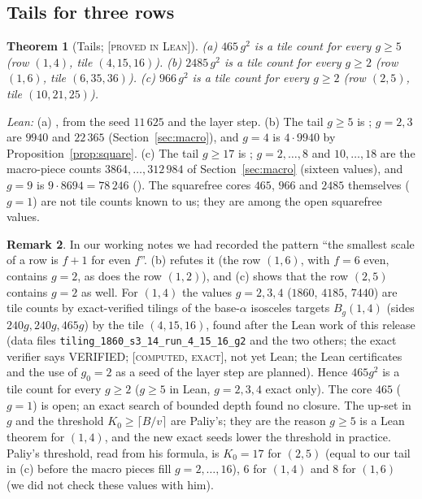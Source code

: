\documentclass[11pt,reqno]{amsart}
\theoremstyle{plain}
\newtheorem{theorem}{Theorem}[section]
\theoremstyle{definition}
\newtheorem{remark}[theorem]{Remark}
\newcommand{\lab}[1]{\textup{[\textsc{#1}]}}
\newcommand{\PL}{\lab{proved in Lean}}
\newcommand{\CE}{\lab{computed, exact}}
\begin{document}
\subsection{Tails for three rows}
\begin{theorem}[Tails; \PL{}]\label{thm:tails}
(a) $465\,g^2$ is a tile count for every $g\ge5$ (row $(1,4)$, tile $(4,15,16)$).
(b) $2485\,g^2$ is a tile count for every $g\ge2$ (row $(1,6)$, tile $(6,35,36)$).
(c) $966\,g^2$ is a tile count for every $g\ge2$ (row $(2,5)$, tile $(10,21,25)$).
\end{theorem}
\emph{Lean:} (a) , from the seed $11\,625$ and the layer step. (b) The tail $g\ge5$ is ; $g=2,3$ are $9940$ and $22\,365$ (Section~\ref{sec:macro}), and $g=4$ is $4\cdot9940$ by Proposition~\ref{prop:square}. (c) The tail $g\ge17$ is ; $g=2,\dots,8$ and $10,\dots,18$ are the macro-piece counts $3864,\dots,312\,984$ of Section~\ref{sec:macro} (sixteen values), and $g=9$ is $9\cdot8694=78\,246$ ().
The squarefree cores $465$, $966$ and $2485$ themselves ($g=1$) are not tile counts known to us; they are among the open squarefree values.
\begin{remark}
In our working notes we had recorded the pattern ``the smallest scale of a row is $f+1$ for even $f$''. (b) refutes it (the row $(1,6)$, with $f=6$ even, contains $g=2$, as does the row $(1,2)$), and (c) shows that the row $(2,5)$ contains $g=2$ as well.
For $(1,4)$ the values $g=2,3,4$ ($1860$, $4185$, $7440$) are tile counts by exact-verified tilings of the base-$\alpha$ isosceles targets $B_g(1,4)$ (sides $240g,240g,465g$) by the tile $(4,15,16)$, found after the Lean work of this release (data files \texttt{tiling\_1860\_s3\_14\_run\_4\_15\_16\_g2} and the two others; the exact verifier says VERIFIED; \CE{}, not yet Lean; the Lean certificates and the use of $g_0=2$ as a seed of the layer step are planned). Hence $465g^2$ is a tile count for every $g\ge2$ ($g\ge5$ in Lean, $g=2,3,4$ exact only). The core $465$ ($g=1$) is open; an exact search of bounded depth found no closure.
The up-set in $g$ and the threshold $K_0\ge\lceil B/v\rceil$ are Paliy's; they are the reason $g\ge5$ is a Lean theorem for $(1,4)$, and the new exact seeds lower the threshold in practice. Paliy's threshold, read from his formula, is $K_0=17$ for $(2,5)$ (equal to our tail in (c) before the macro pieces fill $g=2,\dots,16$), $6$ for $(1,4)$ and $8$ for $(1,6)$ (we did not check these values with him).
\end{remark}
\end{document}
